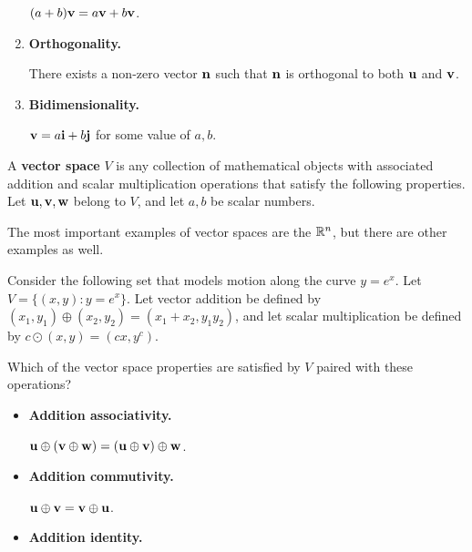\begin{applicationActivities}
\begin{activity}{20}
\begin{multicols}{2}
\begin{enumerate}
        \((a+b)\mathbf v=a\mathbf v+b\mathbf v\).
  \item \textbf{Orthogonality.}

        There exists a non-zero vector \(\mathbf n\) such that
        \(\mathbf n\) is orthogonal to both \(\mathbf u\) and \(\mathbf v\).
  \item \textbf{Bidimensionality.}

        \(\mathbf v=a\mathbf i+b\mathbf j\) for some value of \(a,b\).
\end{enumerate}
\end{multicols}
\end{activity}

\begin{definition}
  A \textbf{vector space} \(V\) is any collection of mathematical objects with
  associated addition and scalar multiplication operations that satisfy
  the following properties. Let \(\mathbf u,\mathbf v,\mathbf w\) belong to \(V\),
  and let \(a,b\) be scalar numbers.

  \vectorSpaceProperties
\end{definition}

\begin{definition}
  The most important examples of vector spaces are the  \(\mathbb{R}^n\), but there are other examples as well.
\end{definition}

\begin{activity}{25}
  Consider the following set that models motion along the curve
  \(y=e^x\). Let \(V=\{(x,y):y=e^x\}\). Let vector addition be defined by
  \((x_1,y_1)\oplus (x_2,y_2)=(x_1+x_2,y_1y_2)\), and
  let scalar multiplication be defined by
  \(c\odot (x,y)=(cx,y^c)\).

  \begin{subactivity}
    Which of the vector space properties are satisfied by \(V\) paired with
    these operations?
    \begin{multicols}{2}
    \begin{itemize}
      \item \textbf{Addition associativity.}

            \(\mathbf u\oplus(\mathbf v\oplus\mathbf w)=
            (\mathbf u\oplus\mathbf v)\oplus\mathbf w\).
      \item \textbf{Addition commutivity.}

            \(\mathbf u\oplus\mathbf v=
            \mathbf v\oplus\mathbf u\).
      \item \textbf{Addition identity.}


\end{itemize}
\end{multicols}
\end{subactivity}
\end{activity}
\end{applicationActivities}
